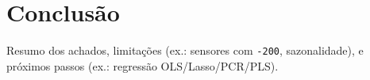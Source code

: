 \section{Conclusão}
Resumo dos achados, limitações (ex.: sensores com \texttt{-200}, sazonalidade), e próximos passos (ex.: regressão OLS/Lasso/PCR/PLS).

